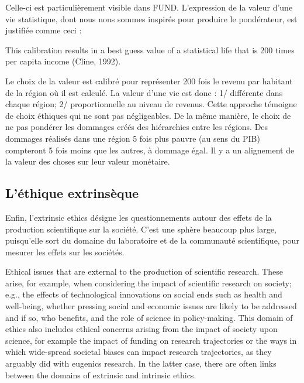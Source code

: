 Celle-ci est particulièrement visible dans FUND. L'expression de la valeur d'une vie statistique, dont nous nous sommes inspirés pour produire le pondérateur, est justifiée comme ceci : 

\begin{authoredquote}
    This calibration results in a best guess value of a statistical life that is 200 times per capita income (Cline, 1992). 
\end{authoredquote}

Le choix de la valeur est calibré pour représenter 200 fois le revenu par habitant de la région où il est calculé. La valeur d'une vie est donc : 1/ différente dans chaque région; 2/ proportionnelle au niveau de revenus. Cette approche témoigne de choix éthiques qui ne sont pas négligeables. De la même manière, le choix de ne pas pondérer les dommages créés des hiérarchies entre les régions. Des dommages réalisés dans une région 5 fois plus pauvre (au sens du PIB) compteront 5 fois moins que les autres, à dommage égal. Il y a un alignement de la valeur des choses sur leur valeur monétaire. 


\subsection{L'éthique extrinsèque}

Enfin, l'\gls{extrinsic ethics} désigne les questionnements autour des effets de la production scientifique sur la société. C'est une sphère beaucoup plus large, puisqu'elle sort du domaine du laboratoire et de la communauté scientifique, pour mesurer les effets sur les sociétés. 

\begin{authoredquote}
Ethical issues that are external to the production of scientific research. These arise, for example, when considering the impact of scientific research on society; e.g., the effects of technological innovations on social ends such as health and well-being, whether pressing social and economic issues are likely to be addressed and if so, who benefits, and the role of science in policy-making. This domain of ethics also includes ethical concerns arising from the impact of society upon science, for example the impact of funding on research trajectories or the ways in which wide-spread societal biases can impact research trajectories, as they arguably did with eugenics research. In the latter case, there are often links between the domains of extrinsic and intrinsic ethics.
\end{authoredquote}

